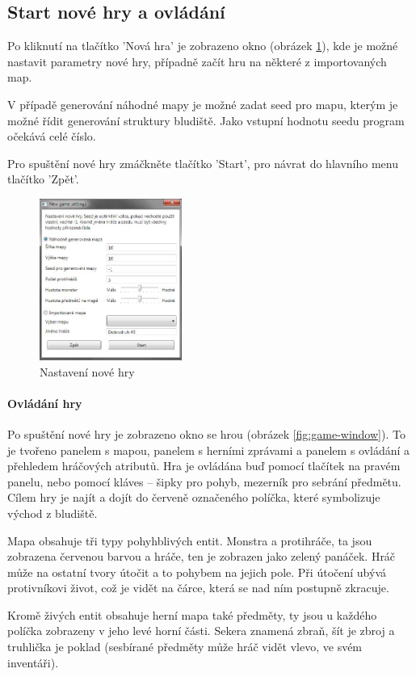 \documentclass[11pt,a4paper]{scrartcl}
\begin{document}
	\subsection{Start nové hry a ovládání}
	Po kliknutí na tlačítko 'Nová hra' je zobrazeno okno (obrázek \ref{fig:new-game-sett}), kde je možné nastavit parametry nové hry, případně začít hru na některé z importovaných map. 
	
	V případě generování náhodné mapy je možné zadat seed pro mapu, kterým je možné řídit generování struktury bludiště. Jako vstupní hodnotu seedu program očekává celé číslo.
	
	Pro spuštění nové hry zmáčkněte tlačítko 'Start', pro návrat do hlavního menu tlačítko 'Zpět'.
	
	\begin{figure}[H]
		\centering
		\includegraphics[height=200px]{new-game-settings-window}
		\caption{Nastavení nové hry}
		\label{fig:new-game-sett}
	\end{figure}
	
	
	\paragraph{Ovládání hry}
	Po spuštění nové hry je zobrazeno okno se hrou (obrázek \ref{fig:game-window}). To je tvořeno panelem s mapou, panelem s herními zprávami a panelem s ovládání a přehledem hráčových atributů. Hra je ovládána buď pomocí tlačítek na pravém panelu, nebo pomocí kláves -- šipky pro pohyb, mezerník pro sebrání předmětu. Cílem hry je najít a dojít do červeně označeného políčka, které symbolizuje východ z bludiště.
	
	Mapa obsahuje tři typy pohyhblivých entit. Monstra a protihráče, ta jsou zobrazena červenou barvou a hráče, ten je zobrazen jako zelený panáček. Hráč může na ostatní tvory útočit a to pohybem na jejich pole. Při útočení ubývá protivníkovi život, což je vidět na čárce, která se nad ním postupně zkracuje.
	
	Kromě živých entit obsahuje herní mapa také předměty, ty jsou u každého políčka zobrazeny v jeho levé horní části. Sekera znamená zbraň, šít je zbroj a truhlička je poklad (sesbírané předměty může hráč vidět vlevo, ve svém inventáři). 
	
\end{document}
